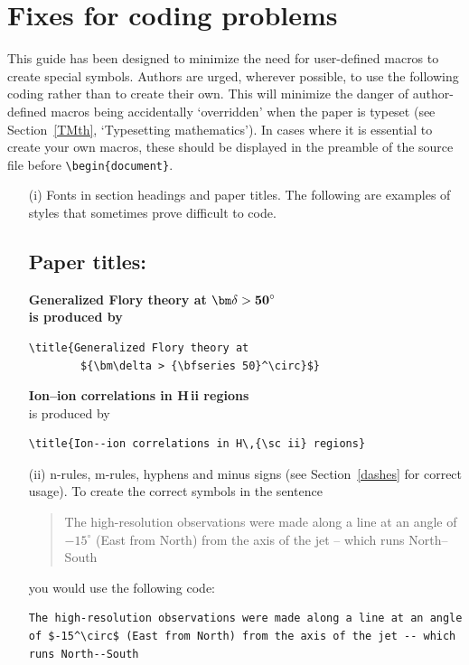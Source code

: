 \documentclass{tADR2e}
\begin{document}
\section{Fixes for coding problems}

This guide has been designed to minimize the need for user-defined macros to  create special symbols. Authors
are urged, wherever possible, to use the following coding rather than to create their own. This will minimize
the danger of author-defined macros being accidentally `overridden' when the paper is typeset (see
Section~\ref{TMth}, `Typesetting mathematics'). In cases where it is essential to create your own macros,
these should be displayed in the preamble of the source file before \verb"\begin{document}".

%
\begin{enumerate}
\item[(i)] Fonts in section headings and paper titles. The following are  examples
of styles that sometimes prove difficult to code.


\subsection*{Paper titles:}

\bf{\noindent Generalized Flory theory at ${\bm\delta >
{\bf
   50}^\circ}$}\\

    \noindent\normalfont is produced by
\begin{verbatim}
\title{Generalized Flory theory at
        ${\bm\delta > {\bfseries 50}^\circ}$}
\end{verbatim}
\bigskip

{\bf{\noindent Ion--ion correlations in H\,{\sc ii} regions}}\\

\noindent\normalfont is produced by
%
\begin{verbatim}
\title{Ion--ion correlations in H\,{\sc ii} regions}
\end{verbatim}



\item[(ii)] n-rules, m-rules, hyphens and minus signs (see Section~\ref{dashes} for
correct usage). To create the correct symbols in the sentence
%
\begin{quote}
The high-resolution observations were made along a line at an
angle of $-15^\circ$ (East from North) from the axis of the
jet -- which runs North--South
\end{quote}
you would use the following code:
%
\begin{verbatim}
The high-resolution observations were made along a line at an angle
of $-15^\circ$ (East from North) from the axis of the jet -- which
runs North--South
\end{verbatim}


\end{enumerate}
\end{document}
